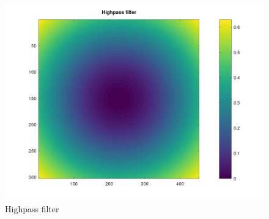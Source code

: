 \documentclass[12pt,a4paper]{article}
\begin{document}
\begin{figure}[h]
	\begin{center}
		\includegraphics[scale=1.0]{./images/ex03_2.png}
		\caption{Highpass filter} 
	\end{center}
\end{figure}
\end{document}
